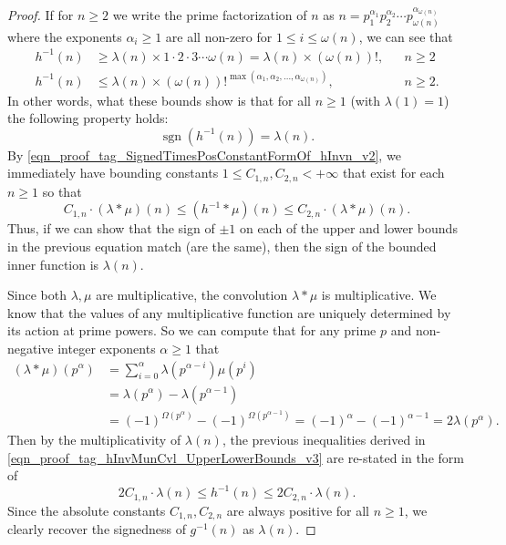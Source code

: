 \documentclass[11pt,reqno,a4letter]{article}
\numberwithin{figure}{section}
\numberwithin{table}{section}
\theoremstyle{plain}
\numberwithin{theorem}{section}
\theoremstyle{definition}
\begin{document}
\begin{proof}
If for $n \geq 2$ we write the prime factorization of $n$ as 
$n = p_1^{\alpha_1} p_2^{\alpha_2} \cdots p_{\omega(n)}^{\alpha_{\omega(n)}}$ where the exponents $\alpha_i \geq 1$ are all 
non-zero for $1 \leq i \leq \omega(n)$, we can see that 
\begin{align*} 
h^{-1}(n) & \geq \lambda(n) \times 1 \cdot 2 \cdot 3 \cdots \omega(n) = \lambda(n) \times (\omega(n))!, && n \geq 2 \\ 
h^{-1}(n) & \leq \lambda(n) \times (\omega(n))!^{\max(\alpha_1, \alpha_2, \ldots, \alpha_{\omega(n)})}, && n \geq 2. 
\end{align*} 
In other words, what these bounds show is that for all $n \geq 1$ (with $\lambda(1) = 1$) the following property holds: 
\begin{equation} 
\label{eqn_proof_tag_SignedTimesPosConstantFormOf_hInvn_v2}
\operatorname{sgn}(h^{-1}(n)) = \lambda(n). 
\end{equation}
By \eqref{eqn_proof_tag_SignedTimesPosConstantFormOf_hInvn_v2}, we immediately have bounding constants 
$1 \leq C_{1,n}, C_{2,n} < +\infty$ that exist for each $n \geq 1$ so that 
\begin{equation} 
\label{eqn_proof_tag_hInvMunCvl_UpperLowerBounds_v3} 
C_{1,n} \cdot (\lambda \ast \mu)(n) \leq (h^{-1} \ast \mu)(n) \leq C_{2,n} \cdot (\lambda \ast \mu)(n). 
\end{equation} 
Thus, if we can show that the sign of $\pm 1$ on each of the upper and lower bounds in the previous equation 
match (are the same), then the sign of the bounded inner function is $\lambda(n)$. 

Since both $\lambda,\mu$ are multiplicative, the convolution $\lambda \ast \mu$ is multiplicative. 
We know that the values of 
any multiplicative function are uniquely determined by its action at prime powers. 
So we can compute that for any prime $p$ and non-negative integer exponents $\alpha \geq 1$ that 
\begin{align*} 
(\lambda \ast \mu)(p^{\alpha}) & = \sum_{i=0}^{\alpha} \lambda(p^{\alpha-i}) \mu(p^{i}) \\ 
     & = \lambda(p^{\alpha}) - \lambda(p^{\alpha-1}) \\ 
     & = 
     (-1)^{\Omega(p^{\alpha})} - (-1)^{\Omega(p^{\alpha-1})} = 
     (-1)^{\alpha} - (-1)^{\alpha-1} = 
     2 \lambda(p^{\alpha}). 
\end{align*} 
Then by the multiplicativity of $\lambda(n)$, the previous inequalities derived in 
\eqref{eqn_proof_tag_hInvMunCvl_UpperLowerBounds_v3} are re-stated in the form of 
\[
2 C_{1,n} \cdot \lambda(n) \leq h^{-1}(n) \leq 2 C_{2,n} \cdot \lambda(n). 
\] 
Since the absolute constants $C_{1,n}, C_{2,n}$ are always positive for all $n \geq 1$, 
we clearly recover the signedness of $g^{-1}(n)$ as $\lambda(n)$. 
\end{proof} 
\end{document}
